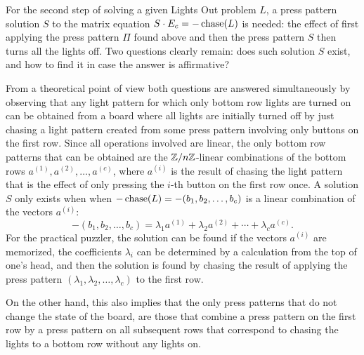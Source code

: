 For the second step of solving a given Lights Out problem
$L$, a press pattern solution $S$ to the matrix
equation $S\cdot E_c=-\operatorname{chase}(L)$ is needed:
the effect of first applying the press pattern
$\Pi$ found above and then the press pattern $S$ then turns all the lights off.
Two questions clearly remain: does such solution $S$ exist, and how
to find it in case the answer is affirmative?

From a theoretical point of view
both questions are answered simultaneously by observing that
any light pattern for which only bottom row lights are turned on
can be obtained from a board where all lights are initially turned off
by just chasing a light pattern created from some
press pattern involving only buttons on the first row.
Since all operations involved are linear, the only bottom row patterns
that can be obtained are the $\mathbb{Z}/n\mathbb{Z}$-linear combinations of the
bottom rows $a^{(1)}, a^{(2)}, \ldots, a^{(c)}$, where $a^{(i)}$ is the result of
chasing the light pattern that is the effect of only pressing the $i$-th
button on the first row once. A solution $S$ only exists when
when $-\operatorname{chase}(L)=-(b_1, b_2, \ldots, b_c)$ is a linear combination
of the vectors $a^{(i)}$:
$$-(b_1, b_2, \ldots, b_c)=\lambda_1a^{(1)}+\lambda_2a^{(2)}+\cdots+\lambda_ca^{(c)}.$$
For the practical puzzler, the solution can be found if the vectors $a^{(i)}$
are memorized, the coefficients $\lambda_i$ can be determined by a calculation
from the top of one's head, and then the solution is found
by chasing the result of applying the press pattern 
$(\lambda_1, \lambda_2, \ldots, \lambda_c)$ to the first row.


On the other hand, this also implies that the only press patterns
that do not change the state of the board, are those that combine
a press pattern on the first row by a press pattern on all subsequent
rows that correspond to chasing the lights to a bottom row without any
lights on.


